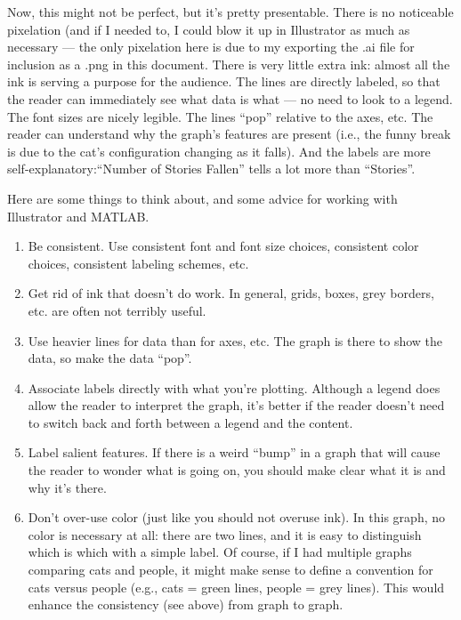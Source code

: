 \documentclass{tufte-handout}
\begin{document}
Now, this might not be perfect,  but it's pretty presentable.  There is no noticeable pixelation (and if I needed to, I could blow it up in Illustrator as much as necessary --- the only pixelation here is due to my exporting the .ai file for inclusion as a .png in this document.  There is very little extra ink: almost all the ink is serving a purpose for the audience.  The lines are directly labeled, so that the reader can immediately see what data is what --- no need to look to a legend.  The font sizes are nicely legible.  The lines ``pop'' relative to the axes, etc.  The reader can understand why the graph's features are present (i.e., the funny break is due to the cat's configuration changing as it falls).  And the labels are more self-explanatory:``Number of Stories Fallen'' tells a lot more than ``Stories''.

Here are some things to think about, and some advice for working with Illustrator and MATLAB. 
\begin{enumerate}
\item Be consistent.  Use consistent font and font size choices, consistent color choices, consistent labeling schemes, etc. 
\item Get rid of ink that doesn't do work.  In general, grids, boxes, grey borders, etc. are often not terribly useful.
\item Use heavier lines for data than for axes, etc.  The graph is there to show the data, so make the data ``pop''.
\item Associate labels directly with what you're plotting.  Although a legend does allow the reader to interpret the graph, it's better if the reader doesn't need to switch back and forth between a legend and the content.
\item Label salient features.  If there is a weird ``bump'' in a graph that will cause the reader to wonder what is going on, you should make clear what it is and why it's there.
\item Don't over-use color (just like you should not overuse ink).  In this graph, no color is necessary at all: there are two lines, and it is easy to distinguish which is which with a simple label.  Of course, if I had multiple graphs comparing cats and people, it might make sense to define a convention for cats versus people (e.g., cats = green lines, people = grey lines).  This would enhance the consistency (see above) from graph to graph.  
\end{enumerate}
\end{document}
